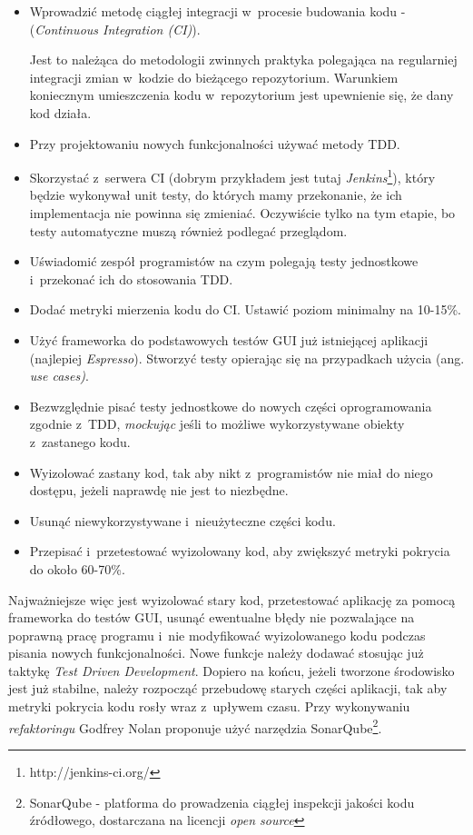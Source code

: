 \begin{itemize}
\item 
Wprowadzić metodę ciągłej integracji w~procesie budowania kodu -  (\textit{Continuous Integration (CI)}).

Jest to należąca do metodologii zwinnych praktyka polegająca na regularniej integracji zmian w~kodzie do bieżącego repozytorium. Warunkiem koniecznym umieszczenia kodu w~repozytorium jest upewnienie się, że dany kod działa.

\item
Przy projektowaniu nowych funkcjonalności używać metody TDD.

\item
Skorzystać z~serwera CI (dobrym przykładem jest tutaj \textit{Jenkins}\footnote{http://jenkins-ci.org/}), który będzie wykonywał unit testy, do których mamy przekonanie, że ich implementacja nie powinna się zmieniać. Oczywiście tylko na tym etapie, bo testy automatyczne muszą również podlegać przeglądom.

\item
Uświadomić zespół programistów na czym polegają testy jednostkowe i~przekonać ich do stosowania TDD.

\item
Dodać metryki mierzenia kodu do CI. Ustawić poziom minimalny na 10-15\%.

\item
Użyć frameworka do podstawowych testów GUI już istniejącej aplikacji (najlepiej \textit{Espresso}). Stworzyć testy opierając się na przypadkach użycia (ang. \textit{use cases)}.

\item
Bezwzględnie pisać testy jednostkowe do nowych części oprogramowania zgodnie z~TDD, \textit{mockując} jeśli to możliwe wykorzystywane obiekty z~zastanego kodu.

\item
Wyizolować zastany kod, tak aby nikt z~programistów nie miał do niego dostępu, jeżeli naprawdę nie jest to niezbędne.

\item
Usunąć niewykorzystywane i~nieużyteczne części kodu.

\item
Przepisać i~przetestować wyizolowany kod, aby zwiększyć metryki pokrycia do około 60-70\%. 
\end{itemize}

Najważniejsze więc jest wyizolować stary kod, przetestować aplikację za pomocą frameworka do testów GUI, usunąć ewentualne błędy nie pozwalające na poprawną pracę programu i~nie modyfikować wyizolowanego kodu podczas pisania nowych funkcjonalności. Nowe funkcje należy dodawać stosując już taktykę \textit{Test Driven Development}. Dopiero na końcu, jeżeli tworzone środowisko jest już stabilne, należy rozpocząć przebudowę starych części aplikacji, tak aby metryki pokrycia kodu rosły wraz z~upływem czasu. Przy wykonywaniu \textit{refaktoringu} Godfrey Nolan proponuje użyć narzędzia SonarQube\footnote{SonarQube - platforma do prowadzenia ciągłej inspekcji jakości kodu źródłowego, dostarczana na licencji \textit{open source}}.